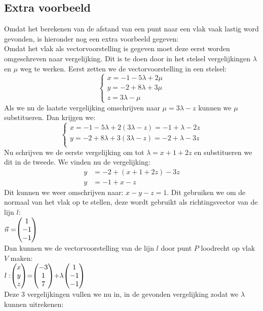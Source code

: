 \newpage 
\subsection{Extra voorbeeld}
Omdat het berekenen van de afstand van een punt naar een vlak vaak lastig word gevonden, is hieronder nog een extra voorbeeld gegeven: \\

Omdat het vlak als vectorvoorstelling is gegeven moet deze eerst worden omgeschreven naar vergelijking. Dit is te doen door in het stelsel vergelijkingen $\lambda$ en $\mu$ weg te werken.
Eerst zetten we de vectorvoorstelling in een stelsel:
\[\begin{cases}
x = -1 -5\lambda + 2\mu\\
y = -2 + 8\lambda + 3\mu\\
z = 3\lambda - \mu  
\end{cases}
\] 
Als we nu de laatste vergelijking omschrijven naar $\mu = 3\lambda-z$ kunnen we $\mu$ substitueren. Dan krijgen we:
\[\begin{cases}
x = -1 -5\lambda + 2(3\lambda-z) = -1 + \lambda -2z\\
y = -2 + 8\lambda + 3(3\lambda-z) = -2 + \lambda - 3z\\
\end{cases}
\] 
Nu schrijven we de eerste vergelijking om tot $\lambda = x + 1 + 2z$ en substitueren we dit in de tweede. We vinden nu de vergelijking: 
\begin{align*}
    y &= -2+(x+1+2z) -3z \\
    y &= -1 + x - z
\end{align*}
Dit kunnen we weer omschrijven naar: $x-y-z=1$. Dit gebruiken we om de normaal van het vlak op te stellen, deze wordt gebruikt als richtingsvector van de lijn $l$: \\
    $ \vec{n} = \vecdrie{1}{-1}{-1}  $ \\
Dan kunnen we de vectorvoorstelling van de lijn $l$ door punt $P$ loodrecht op vlak $V$ maken: \\
$l: \vecdrie{x}{y}{z} = \vecdrie{-3}{1}{7} + \lambda \vecdrie{1}{-1}{-1} $ \\
Deze 3 vergelijkingen vullen we nu in, in de gevonden vergelijking zodat we $\lambda$ kunnen uitrekenen:
